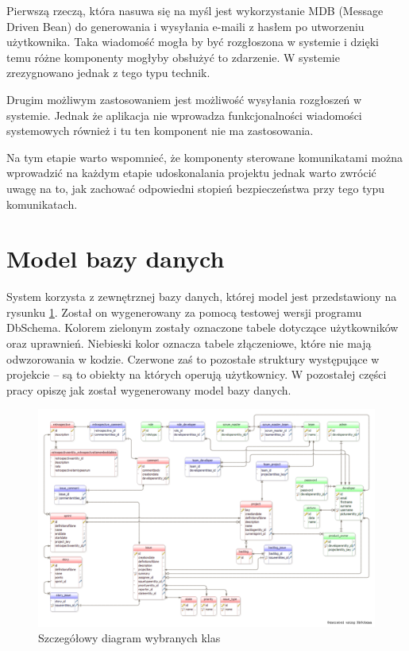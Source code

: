 Pierwszą rzeczą, która nasuwa się na myśl jest wykorzystanie MDB (Message Driven Bean) do generowania i wysyłania e-maili z hasłem po utworzeniu użytkownika. Taka wiadomość mogła by być rozgłoszona w systemie i dzięki temu różne komponenty mogłyby obsłużyć to zdarzenie. W systemie zrezygnowano jednak z tego typu technik.

Drugim możliwym zastosowaniem jest możliwość wysyłania rozgłoszeń w systemie. Jednak że aplikacja nie wprowadza funkcjonalności wiadomości systemowych również i tu ten komponent nie ma zastosowania.

Na tym etapie warto wspomnieć, że komponenty sterowane komunikatami można wprowadzić na każdym etapie udoskonalania projektu jednak warto zwrócić uwagę na to, jak zachować odpowiedni stopień bezpieczeństwa przy tego typu komunikatach.

\section{Model bazy danych}
System korzysta z zewnętrznej bazy danych, której model jest przedstawiony na rysunku \ref{fig:modeldb}. Został on wygenerowany za pomocą testowej wersji programu DbSchema. Kolorem zielonym zostały oznaczone tabele dotyczące użytkowników oraz uprawnień. Niebieski kolor oznacza tabele złączeniowe, które nie mają odwzorowania w kodzie. Czerwone zaś to pozostałe struktury występujące w projekcie -- są to obiekty na których operują użytkownicy. W pozostałej części pracy opiszę jak został wygenerowany model bazy danych.

\begin{figure}
	\centering
	\includegraphics[width=25cm]{rysunki/modeldb.png}	
	\caption{Szczegółowy diagram wybranych klas}
	\label{fig:modeldb}
\end{figure}

